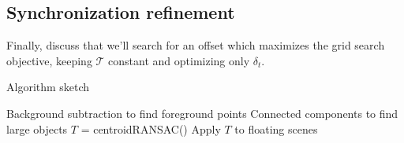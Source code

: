 \documentclass[letterpaper, 10 pt, conference]{ieeeconf}  %
\begin{document}
\subsection{Synchronization refinement}
Finally, discuss that we'll search for an offset which maximizes the grid search objective, keeping $\mathcal{T}$ 
constant and optimizing only $\delta_t$. 



%
%
%

\begin{algorithm}
  \caption{Algorithm sketch}
  \label{alg:sketch}
  \SetLine
  \phantom{\;}
  Background subtraction to find foreground points\;
  Connected components to find large objects\;
  $T$ = centroidRANSAC()\;
  Apply $T$ to floating scenes\;
\end{algorithm}
\end{document}
